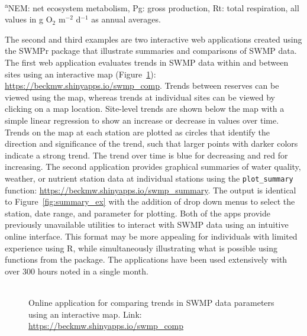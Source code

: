 \begin{table}[!tbp]
\footnotesize{\textsuperscript{a}NEM: net ecosystem metabolism, Pg: gross production, Rt: total respiration, all values in g O$_2$ m$^{-2}$ d$^{-1}$ as annual averages.}\end{table}


The second and third examples are two interactive web applications \cite{Chang15} created using the SWMPr package that illustrate summaries and comparisons of SWMP data.  The first web application evaluates trends in SWMP data within and between sites using an interactive map (Figure~\ref{fig:swmp_comp}): \href{https://beckmw.shinyapps.io/swmp_comp}{https://beckmw.shinyapps.io/swmp\_comp}.  Trends between reserves can be viewed using the map, whereas trends at individual sites can be viewed by clicking on a map location.  Site-level trends are shown below the map with a simple linear regression to show an increase or decrease in values over time.  Trends on the map at each station are plotted as circles that identify the direction and significance of the trend, such that larger points with darker colors indicate a strong trend.  The trend over time is blue for decreasing and red for increasing.  The second application provides graphical summaries of water quality, weather, or nutrient station data at individual stations using the \texttt{plot\_summary} function: \href{https://beckmw.shinyapps.io/swmp_summary/}{https://beckmw.shinyapps.io/swmp\_summary}.  The output is identical to Figure~\ref{fig:summary_ex} with the addition of drop down menus to select the station, date range, and parameter for plotting. Both of the apps provide previously unavailable utilities to interact with SWMP data using an intuitive online interface.  This format may be more appealing for individuals with limited experience using R, while simultaneously illustrating what is possible using functions from the package. The applications have been used extensively with over 300 hours noted in a single month.   

\begin{figure}
\begin{center}
\includegraphics[width = 0\textwidth]{figure/swmp_comp.pdf}
\caption{Online application for comparing trends in SWMP data parameters using an interactive map.  Link: \href{https://beckmw.shinyapps.io/swmp_comp}{https://beckmw.shinyapps.io/swmp\_comp}}
\label{fig:swmp_comp}
\end{center}
\end{figure}

